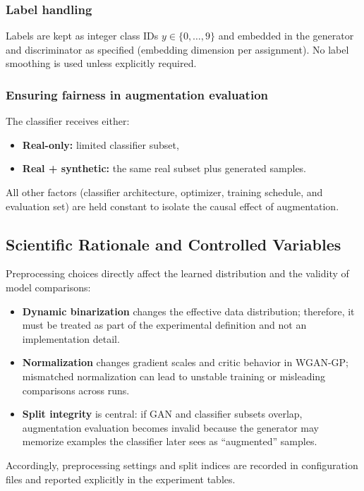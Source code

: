 \subsubsection{Label handling}
Labels are kept as integer class IDs $y\in\{0,\dots,9\}$ and embedded in the generator and discriminator as specified (embedding dimension per assignment). No label smoothing is used unless explicitly required.

\subsubsection{Ensuring fairness in augmentation evaluation}
The classifier receives either:
\begin{itemize}
  \item \textbf{Real-only:} limited classifier subset,
  \item \textbf{Real + synthetic:} the same real subset plus generated samples.
\end{itemize}
All other factors (classifier architecture, optimizer, training schedule, and evaluation set) are held constant to isolate the causal effect of augmentation.

\subsection{Scientific Rationale and Controlled Variables}
Preprocessing choices directly affect the learned distribution and the validity of model comparisons:
\begin{itemize}
  \item \textbf{Dynamic binarization} changes the effective data distribution; therefore, it must be treated as part of the experimental definition and not an implementation detail.
  \item \textbf{Normalization} changes gradient scales and critic behavior in WGAN-GP; mismatched normalization can lead to unstable training or misleading comparisons across runs.
  \item \textbf{Split integrity} is central: if GAN and classifier subsets overlap, augmentation evaluation becomes invalid because the generator may memorize examples the classifier later sees as ``augmented'' samples.
\end{itemize}
Accordingly, preprocessing settings and split indices are recorded in configuration files and reported explicitly in the experiment tables.


